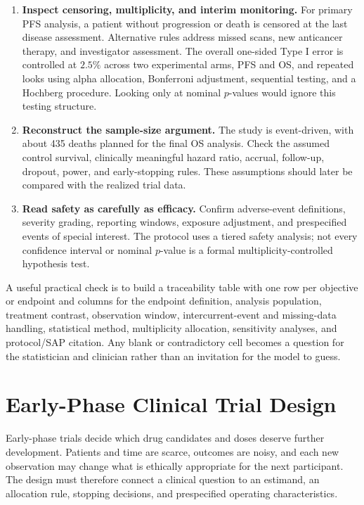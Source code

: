 \documentclass[12pt,oneside]{book}
\numberwithin{equation}{section}
\theoremstyle{definition}
\theoremstyle{plain}
\theoremstyle{remark}
\begin{document}
\begin{enumerate}
    \item \textbf{Inspect censoring, multiplicity, and interim monitoring.} For primary PFS analysis, a patient without progression or death is censored at the last disease assessment. Alternative rules address missed scans, new anticancer therapy, and investigator assessment. The overall one-sided Type I error is controlled at $2.5\%$ across two experimental arms, PFS and OS, and repeated looks using alpha allocation, Bonferroni adjustment, sequential testing, and a Hochberg procedure. Looking only at nominal $p$-values would ignore this testing structure.
    \item \textbf{Reconstruct the sample-size argument.} The study is event-driven, with about 435 deaths planned for the final OS analysis. Check the assumed control survival, clinically meaningful hazard ratio, accrual, follow-up, dropout, power, and early-stopping rules. These assumptions should later be compared with the realized trial data.
    \item \textbf{Read safety as carefully as efficacy.} Confirm adverse-event definitions, severity grading, reporting windows, exposure adjustment, and prespecified events of special interest. The protocol uses a tiered safety analysis; not every confidence interval or nominal $p$-value is a formal multiplicity-controlled hypothesis test.
\end{enumerate}
A useful practical check is to build a traceability table with one row per objective or endpoint and columns for the endpoint definition, analysis population, treatment contrast, observation window, intercurrent-event and missing-data handling, statistical method, multiplicity allocation, sensitivity analyses, and protocol/SAP citation. Any blank or contradictory cell becomes a question for the statistician and clinician rather than an invitation for the model to guess.

\section{Early-Phase Clinical Trial Design}

Early-phase trials decide which drug candidates and doses deserve further
development.  Patients and time are scarce, outcomes are noisy, and each new
observation may change what is ethically appropriate for the next participant.
The design must therefore connect a clinical question to an estimand, an
allocation rule, stopping decisions, and prespecified operating characteristics.
\end{document}
